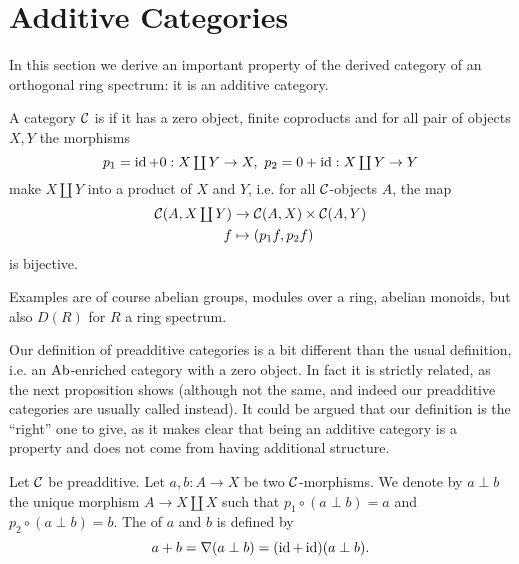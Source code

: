 \section{Additive Categories}

In this section we derive an important property of the derived category of an orthogonal ring spectrum: it is an additive category.

\begin{definition}
A category $\mathcal{C}$ is  if it has a zero object, finite coproducts and for all pair of objects $X,Y$ the morphisms
\[p_1=\operatorname{id}+0:X\textstyle\coprod Y\to X,\ p_2=0+\operatorname{id}:X\textstyle\coprod Y\to Y\]
make $X\coprod Y$ into a product of $X$ and $Y$, i.e. for all $\mathcal{C}$-objects $A$, the map
\begin{align*}
    \mathcal{C}(A,X\textstyle\coprod Y)&\to\mathcal{C}(A,X)\times\mathcal{C}(A,Y)\\
    f&\mapsto(p_1f,p_2f)
\end{align*}
is bijective.
\end{definition}

\begin{examples}
Examples are of course abelian groups, modules over a ring, abelian monoids, but also $D(R)$ for $R$ a ring spectrum.
\end{examples}

\begin{remark}
Our definition of preadditive categories is a bit different than the usual definition, i.e. an ${\normalfont\textup{Ab}}$-enriched category with a zero object. In fact it is strictly related, as the next proposition shows (although not the same, and indeed our preadditive categories are usually called  instead). It could be argued that our definition is the \enquote{right} one to give, as it makes clear that being an additive category is a property and does not come from having additional structure.
\end{remark}

\begin{construction}
Let $\mathcal{C}$ be preadditive. Let $a,b:A\to X$ be two $\mathcal{C}$-morphisms. We denote by $a\perp b$ the unique morphism $A\to X\coprod X$ such that $p_1\circ(a\perp b)=a$ and $p_2\circ(a\perp b)=b$. The  of $a$ and $b$ is defined by
\[a+b=\nabla(a\perp b)=(\operatorname{id}+\operatorname{id})(a\perp b).\]
\end{construction}

